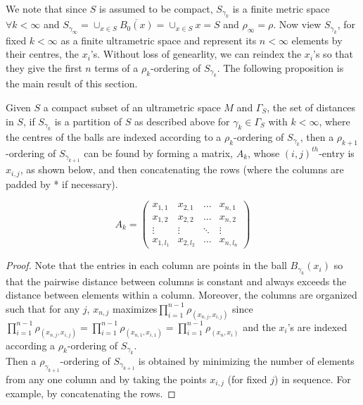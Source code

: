 We note that since $S$ is assumed to be compact,  $S_{\gamma_k}$ is a finite metric space $\forall k < \infty$ and $S_{\gamma_\infty}=\cup_{x \in S}\overline{B_0(x)} = \cup_{x \in S}x=S$ and $\rho_\infty=\rho$.  Now view $S_{\gamma_k}$, for fixed $k < \infty$ as a finite ultrametric space and represent its $n < \infty$ elements by their centres, the $x_i$'s. Without loss of genearlity, we can reindex the $x_i$'s so that they give the first $n$ terms of a $\rho_k$-ordering of $S_{\gamma_k}$. The following proposition is the main result of this section.

\begin{proposition*}
Given $S$ a compact subset of an ultrametric space $M$ and $\Gamma_S$, the set of distances in $S$, if $S_{\gamma_k}$ is a partition of $S$ as described above for $\gamma_k \in \Gamma_S$ with $k < \infty$, where the centres of the balls are indexed according to a $\rho_k$-ordering of $S_{\gamma_k}$, then a $\rho_{k+1}$-ordering of $S_{\gamma_{k+1}}$ can be found by forming a matrix, $A_k$, whose $(i,j)^{th}$-entry is $x_{i,j}$, as shown below, and then concatenating the rows (where the columns are padded by * if necessary). 
\end{proposition*}

\[A_k=
 \begin{pmatrix}
  x_{1,1} & x_{2,1} & \ldots  &x_{n,1} \\
  x_{1,2} & x_{2,2} &\ldots &x_{n,2} \\
  \vdots & \vdots & \ddots & \vdots \\
  x_{1,l_1} & x_{2,l_2} & \ldots &x_{n,l_n}
 \end{pmatrix}
\]


\begin{proof}
Note that the entries in each column are points in the ball $B_{\gamma_k}(x_i)$ so that the pairwise distance between columns is constant and always exceeds the distance between elements within a column. Moreover, the columns are organized such that for any $j$, $x_{n,j}$ maximizes$\prod_{i=1}^{n-1} \rho_(x_{n,j},x_{i,j})$ since $\prod_{i=1}^{n-1} \rho_(x_{n,j},x_{i,j}) = \prod_{i=1}^{n-1} \rho_(x_{n,1},x_{i,1}) = \prod_{i=1}^{n-1} \rho_(x_{n},x_{i})$ and the $x_i$'s are indexed according a $\rho_k$-ordering of $S_{\gamma_k}$.\\

Then a $\rho_{\gamma_{k+1}}$-ordering of $S_{\gamma_{k+1}}$ is obtained by minimizing the number of elements from any one column and by taking the points $x_{i,j}$ (for fixed $j$) in sequence. For example, by concatenating the rows.
\end{proof}

